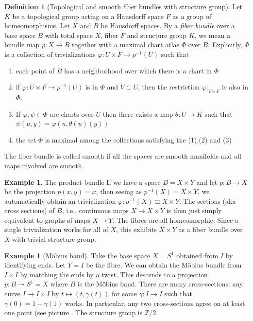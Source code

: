 \documentclass[reqno]{amsart}
\theoremstyle{definition}
\newtheorem{definition}[theorem]{Definition}
\newtheorem{example}[theorem]{Example}
\theoremstyle{remark}
\begin{document}
    \begin{definition}[Topological and
        smooth fiber bundles with structure group]
    Let $K$ be a topological group acting on a
    Hausdorff space $F$ as a group of homeomorphisms.
    Let $X$ and $B$ be Hausdorff spaces. By a
    \textit{fiber bundle} over a base space
    $B$ with total space $X$, fiber $F$ and structure
    group $K$, we mean a bundle map
    $p \colon X \to B$ together with a maximal
    chart atlas
    $\Phi$ over $B$. Explicitly, $\Phi$ is a collection
    of trivializations
    $\varphi  \colon U
    \times F \to p^{-1}(U)$ such that
    \begin{enumerate}
        \item each point of $B$ has a neighborhood
            over which there is a chart in
            $\Phi$
        \item if $ \varphi \colon U \times F
            \to p^{-1} (U) $ is in
            $\Phi$ and  $V \subset U$, then the
            restriction
            $\varphi |_{V \times F}$ is also in
            $\Phi$.
        \item If $\varphi , \psi  \in \Phi$ are
            charts over $U$ then there exists a map
            $\theta \colon U \to K$ such that
            $\psi \left( u, y \right)
            = \varphi \left( u, \theta(u) (y) \right) $
        \item the set $\Phi$ is maximal among the collections
            satisfying the (1),(2) and (3)
    \end{enumerate}
    The fiber bundle is called smooth if all the spaces
    are smooth manifolds and all maps involved are smooth.
\end{definition}

\begin{example}{The product bundle}
    If we have a space $B = X \times Y$ and let
    $p \colon B \to X$ be the projection
    $p(x,y) = x$, then seeing as
     $p^{-1}(X) = X\times Y$, we automatically obtain
     an trivialization
      $\varphi  \colon p^{-1}(X) \cong X \times Y$.
      The sections (aka cross sections) of 
      $B$, i.e., continuous maps
      $X \to X \times Y$ is then just simply equivalent to
      graphs of maps $X \to Y$. The fibres are
      all homeomorphic.
      Since a single trivialization works for all
      of $X$, this exhibits $X \times Y$ 
      as a fiber bundle over $X$ with trivial structure group.
\end{example}

\begin{example}[Möbius band]
    Take the base space $X = S^{1}$ obtained from
    $I$ by identifying ends. Let $Y = I$ be the fibre.
    We can obtain the Möbius bundle from
    $I \times I$ by matching the ends by a twist. This
    descends to a projection
    $p \colon B \to S^{1} = X$ where $B$ is the Möbius band.
    There are many cross-sections: any curve
    $I \to I \times I$ by $t \mapsto \left( t, 
    \gamma(t) \right) $ for some $\gamma \colon I \to I$ 
    such that $\gamma(0) = 1- \gamma(1)$ works. In particular,
    any two cross-sections agree on at least one point (see
    picture \cite[p. 4]{Steenrod}. The structure group
    is $\mathbb{Z} /2$.
\end{example}
\end{document}
